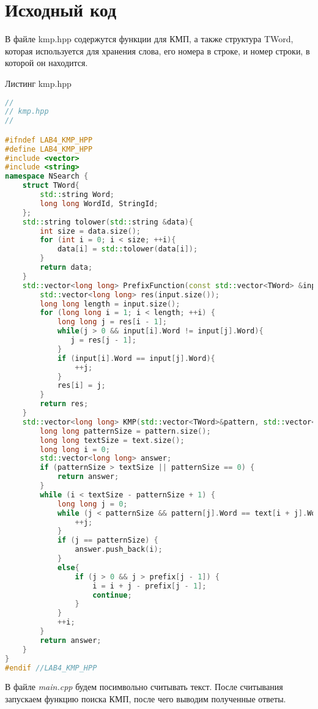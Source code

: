 \pagebreak

\section{Исходный код}
В файле kmp.hpp содержутся функции для КМП, а также структура TWord, которая используется для хранения слова, его номера в строке, и номер строки, в которой он находится.
\begin{center}Листинг kmp.hpp\end{center} 
\begin{lstlisting}[language=C++]
//
// kmp.hpp
//

#ifndef LAB4_KMP_HPP
#define LAB4_KMP_HPP
#include <vector>
#include <string>
namespace NSearch {
    struct TWord{
        std::string Word;
        long long WordId, StringId;
    };
    std::string tolower(std::string &data){
        int size = data.size();
        for (int i = 0; i < size; ++i){
            data[i] = std::tolower(data[i]);
        }
        return data;
    }
    std::vector<long long> PrefixFunction(const std::vector<TWord> &input) {
        std::vector<long long> res(input.size());
        long long length = input.size();
        for (long long i = 1; i < length; ++i) {
            long long j = res[i - 1];
            while(j > 0 && input[i].Word != input[j].Word){
               j = res[j - 1];
            }
            if (input[i].Word == input[j].Word){
                ++j;
            }
            res[i] = j;
        }
        return res;
    }
    std::vector<long long> KMP(std::vector<TWord>&pattern, std::vector<TWord> &text, std::vector<long long> &prefix){
        long long patternSize = pattern.size();
        long long textSize = text.size();
        long long i = 0;
        std::vector<long long> answer;
        if (patternSize > textSize || patternSize == 0) {
            return answer;
        }
        while (i < textSize - patternSize + 1) {
            long long j = 0;
            while (j < patternSize && pattern[j].Word == text[i + j].Word) {
                ++j;
            }
            if (j == patternSize) {
                answer.push_back(i);
            }
            else{
                if (j > 0 && j > prefix[j - 1]) {
                    i = i + j - prefix[j - 1];
                    continue;
                }
            }
            ++i;
        }
        return answer;
    }
}
#endif //LAB4_KMP_HPP
\end{lstlisting}
В файле \textit{main.cpp} будем посимвольно считывать текст. После считывания запускаем функцию поиска КМП, после чего выводим полученные ответы.

